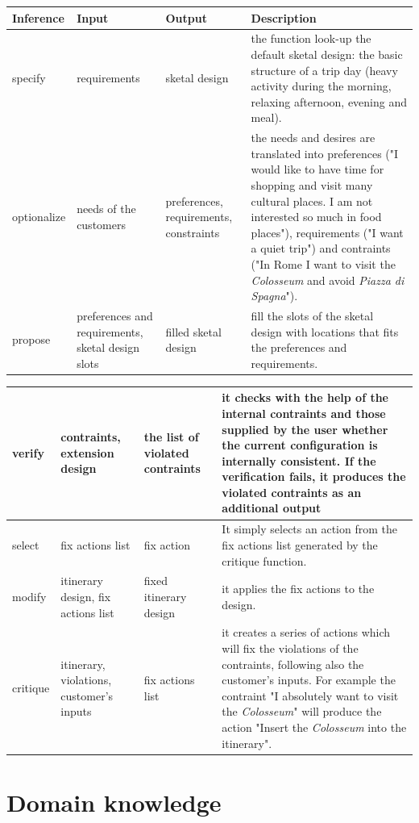 \documentclass[11pt]{article} %
\begin{document}
\noindent
\begin{tabularx}{\textwidth}{| X | X | X | X |}
  \hline
Inference		& Input	& Output 	& Description \\ \hline \hline
specify		& requirements	& sketal design		& the function look-up the default sketal design: the basic structure of a trip day (heavy activity during the morning, relaxing afternoon, evening and meal).
\\ \hline 
   optionalize	& needs of the customers		& preferences, requirements, constraints	& the needs and desires are translated into preferences ("I would like to have time for shopping and visit many cultural places. I am not interested so much in food places"), requirements ("I want a quiet trip") and contraints ("In Rome I want to visit the \emph{Colosseum} and avoid \emph{Piazza di Spagna}"). 
\\ \hline
propose	& preferences and requirements, sketal design slots		& filled sketal design	& fill the slots of the sketal design with locations that fits the preferences and requirements.
\\
\hline
\end{tabularx}
\newpage
\noindent
\begin{tabularx}{\textwidth}{| X | X | X | X |}
\hline
verify		& contraints, extension design	& the list of violated contraints	& it checks with the help of the internal contraints and those supplied by the user whether the current configuration is internally consistent. If the verification fails, it produces the violated contraints as an additional output
\\ \hline
select 	& fix actions list		& fix action		& It simply selects an action from the fix actions list generated by the critique function.
\\ \hline
modify	& itinerary design, fix actions list		& fixed itinerary design		& it applies the fix actions to the design.
\\ \hline
critique	& itinerary, violations, customer's inputs	& fix actions list		& it creates a series of actions which will fix the violations of the contraints, following also the customer's inputs. For example the contraint "I absolutely want to visit the \emph{Colosseum}" will produce the action "Insert the \emph{Colosseum} into the itinerary".
\\ \hline
\end{tabularx}

\clearpage
\section{Domain knowledge}
\end{document}

